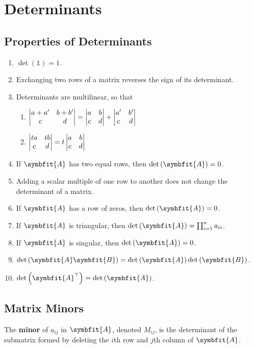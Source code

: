 \documentclass{article}
\begin{document}
\section{Determinants}
	\subsection{Properties of Determinants}
	\begin{enumerate}
		\item $\det{\left( \mathbb{1} \right)}=1$.
		\item Exchanging two rows of a matrix reverses the sign of its determinant.
		\item Determinants are multilinear, so that 
		\begin{enumerate}[label=(\alph*)]
			\item $\mdet{a+a' & b+b' \\ c & d} = \mdet{a & b \\ c & d}+\mdet{a' & b' \\ c & d}$
			\item $\mdet{ta & tb \\ c & d}=t\mdet{a & b \\ c & d}$
		\end{enumerate}
		\item If $\symbfit{A}$ has two equal rows, then $\det{\left( \symbfit{A} \right)}=0$.
		\item Adding a scalar multiple of one row to another does not change the determinant of a matrix.
		\item If $\symbfit{A}$ has a row of zeros, then $\det{\left( \symbfit{A} \right)}=0$.
		\item If $\symbfit{A}$ is triangular, then $\det{\left( \symbfit{A} \right)}=\prod_{i=1}^{n} a_{ii}$.
		\item If $\symbfit{A}$ is singular, then $\det{\left( \symbfit{A} \right)}=0$.
		\item $\det{\left( \symbfit{A}\symbfit{B} \right)}=\det{\left( \symbfit{A} \right)}\det{\left( \symbfit{B} \right)}$.
		\item $\det{\left( \symbfit{A}^\top \right)}=\det{\left( \symbfit{A} \right)}$.
	\end{enumerate}
	\subsection{Matrix Minors}
	\begin{definition}
		The \textbf{minor} of $a_{ij}$ in $\symbfit{A}$, denoted $M_{ij}$, is the determinant of the submatrix formed by deleting the $i$th row and $j$th column of $\symbfit{A}$.
	\end{definition}
\end{document}

